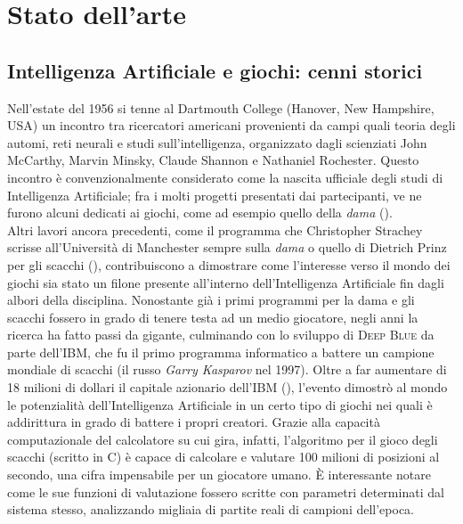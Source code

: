 \chapter*{Stato dell'arte}
\graphicspath{{Chapter2/Chapter2Figs/PNG/}{Chapter2/Chapter2Figs/PDF/}{Chapter2/Chapter2Figs/}}

\section{Intelligenza Artificiale e giochi: cenni storici}

Nell'estate del 1956 si tenne al Dartmouth College (Hanover, New Hampshire, USA) un incontro tra ricercatori americani provenienti da campi quali teoria degli automi, reti neurali e studi sull'intelligenza, organizzato dagli scienziati John McCarthy, Marvin Minsky, Claude Shannon e Nathaniel Rochester.
Questo incontro è convenzionalmente considerato come la nascita ufficiale degli studi di Intelligenza Artificiale; fra i molti progetti presentati dai partecipanti, ve ne furono alcuni dedicati ai giochi, come ad esempio quello della \emph{dama} (\cite{randw}).\\
Altri lavori ancora precedenti, come il programma che Christopher Strachey scrisse all'Università di Manchester sempre sulla \emph{dama} o quello di Dietrich Prinz per gli scacchi (\cite{historyofcomputing}), contribuiscono a dimostrare come l'interesse verso il mondo dei giochi sia stato un filone presente all'interno dell'Intelligenza Artificiale fin dagli albori della disciplina.
Nonostante già i primi programmi per la dama e gli scacchi fossero in grado di tenere testa ad un medio giocatore, negli anni la ricerca ha fatto passi da gigante, culminando con lo sviluppo di \textsc{Deep Blue} da parte dell'\textsc{IBM}, che fu il primo programma informatico a battere un campione mondiale di scacchi (il russo \emph{Garry Kasparov} nel 1997).
Oltre a far aumentare di 18 milioni di dollari il capitale azionario dell'\textsc{IBM} (\cite{randw}), l'evento dimostrò al mondo le potenzialità dell'Intelligenza Artificiale in un certo tipo di giochi nei quali è addirittura in grado di battere i propri creatori.
Grazie alla capacità computazionale del calcolatore su cui gira, infatti, l’algoritmo per il gioco degli scacchi (scritto in C) è capace di calcolare e valutare 100 milioni di posizioni al secondo, una cifra impensabile per un giocatore umano.
È interessante notare come le sue funzioni di valutazione fossero scritte con parametri determinati dal sistema stesso, analizzando migliaia di partite reali di campioni dell'epoca.\\
